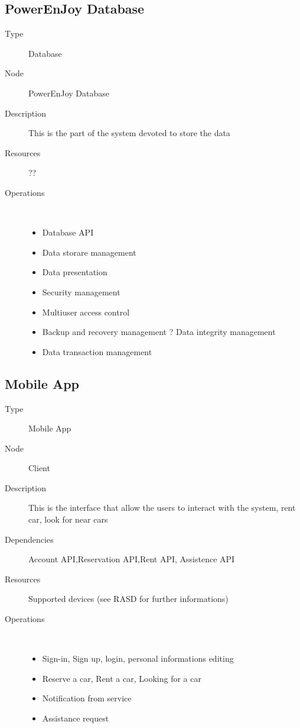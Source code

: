 \subsection{PowerEnJoy Database}
\begin{description}
	\item[Type] Database
	\item[Node] PowerEnJoy Database
	\item[Description] This is the part of the system devoted to store the data 
	\item[Resources] ??
	\item[Operations] \ \\
		\begin{itemize}
			\item Database API
			\item Data storare management
			\item Data presentation
			\item Security management
			\item Multiuser access control
			\item Backup and recovery management ? Data integrity management
			\item Data transaction management	
		\end{itemize}
\end{description}

\subsection{Mobile App}
\begin{description}
	\item[Type] Mobile App
	\item[Node] Client
	\item[Description] This is the interface that allow the users to interact with the system, rent car, look for near cars
	\item[Dependencies] Account API,Reservation API,Rent API, Assistence API
	\item[Resources] Supported devices (see RASD for further informations)
	\item[Operations] \ \\
		\begin{itemize}
			\item Sign-in, Sign up, login, personal informations editing
			\item Reserve a car, Rent a car, Looking for a car
			\item Notification from service
			\item Assistance request
	\end{itemize}
\end{description}

